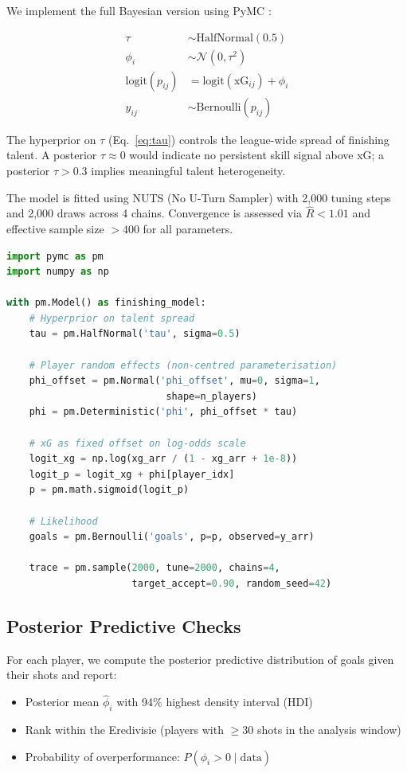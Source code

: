 \documentclass[12pt,a4paper]{article}
\begin{document}
We implement the full Bayesian version using PyMC \citep{pymc2023}:

\begin{align}
\tau &\sim \text{HalfNormal}(0.5) \label{eq:tau} \\[4pt]
\phi_i &\sim \mathcal{N}(0, \tau^2) \label{eq:phi} \\[4pt]
\text{logit}(p_{ij}) &= \text{logit}(\text{xG}_{ij}) + \phi_i \label{eq:logit} \\[4pt]
y_{ij} &\sim \text{Bernoulli}(p_{ij}) \label{eq:likelihood}
\end{align}

The hyperprior on $\tau$ (Eq.~\ref{eq:tau}) controls the league-wide spread of finishing talent. A posterior $\tau \approx 0$ would indicate no persistent skill signal above xG; a posterior $\tau > 0.3$ implies meaningful talent heterogeneity.

The model is fitted using NUTS (No U-Turn Sampler) with 2,000 tuning steps and 2,000 draws across 4 chains. Convergence is assessed via $\hat{R} < 1.01$ and effective sample size $> 400$ for all parameters.

\begin{lstlisting}[language=Python]
import pymc as pm
import numpy as np

with pm.Model() as finishing_model:
    # Hyperprior on talent spread
    tau = pm.HalfNormal('tau', sigma=0.5)

    # Player random effects (non-centred parameterisation)
    phi_offset = pm.Normal('phi_offset', mu=0, sigma=1,
                            shape=n_players)
    phi = pm.Deterministic('phi', phi_offset * tau)

    # xG as fixed offset on log-odds scale
    logit_xg = np.log(xg_arr / (1 - xg_arr + 1e-8))
    logit_p = logit_xg + phi[player_idx]
    p = pm.math.sigmoid(logit_p)

    # Likelihood
    goals = pm.Bernoulli('goals', p=p, observed=y_arr)

    trace = pm.sample(2000, tune=2000, chains=4,
                      target_accept=0.90, random_seed=42)
\end{lstlisting}

\subsection{Posterior Predictive Checks}

For each player, we compute the posterior predictive distribution of goals given their shots and report:
\begin{itemize}
    \item Posterior mean $\hat{\phi}_i$ with 94\% highest density interval (HDI)
    \item Rank within the Eredivisie (players with $\geq 30$ shots in the analysis window)
    \item Probability of overperformance: $P(\phi_i > 0 \mid \text{data})$
\end{itemize}
\end{document}
